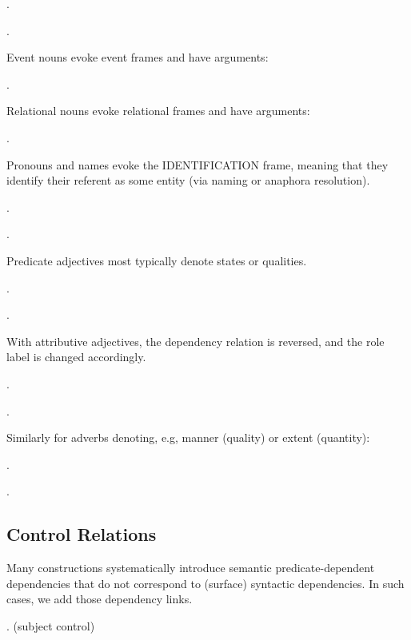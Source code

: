 \documentclass[a4paper]{article}
\newcommand{\fr}[1]{\textsf{#1}}
\newcommand{\rl}[1]{\textsf{#1}}
\begin{document}
\ex.

\ex.

Event nouns evoke event frames and have arguments:

\ex.

Relational nouns evoke relational frames and have arguments:

\ex.

Pronouns and names evoke the \fr{IDENTIFICATION} frame, meaning that they
identify their referent as some entity (via naming or anaphora resolution).

\ex.

\ex.

Predicate adjectives most typically denote states or qualities.

\ex.

\ex.

With attributive adjectives, the dependency relation is reversed, and the role label is changed accordingly.

\ex.

\ex.

Similarly for adverbs denoting, e.g, manner (\rl{quality}) or extent (\rl{quantity}):

\ex.

\ex.

\subsection{Control Relations}
\label{sec:control}


Many constructions systematically introduce semantic predicate-dependent
dependencies that do not correspond to (surface) syntactic dependencies. In such cases, we add those dependency links.

\ex. (subject control)
\end{document}
